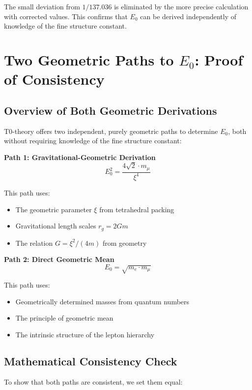 \documentclass[12pt,a4paper]{article}
\begin{document}
	The small deviation from $1/137.036$ is eliminated by the more precise calculation with corrected values. This confirms that $E_0$ can be derived independently of knowledge of the fine structure constant.
	
	\section{Two Geometric Paths to $E_0$: Proof of Consistency}
	
	\subsection{Overview of Both Geometric Derivations}
	
	T0-theory offers two independent, purely geometric paths to determine $E_0$, both without requiring knowledge of the fine structure constant:
	
	\textbf{Path 1: Gravitational-Geometric Derivation}
	\begin{equation}
		E_0^2 = \frac{4\sqrt{2} \cdot m_\mu}{\xi^4}
	\end{equation}
	
	This path uses:
	\begin{itemize}
		\item The geometric parameter $\xi$ from tetrahedral packing
		\item Gravitational length scales $r_g = 2Gm$
		\item The relation $G = \xi^2/(4m)$ from geometry
	\end{itemize}
	
	\textbf{Path 2: Direct Geometric Mean}
	\begin{equation}
		E_0 = \sqrt{m_e \cdot m_\mu}
	\end{equation}
	
	This path uses:
	\begin{itemize}
		\item Geometrically determined masses from quantum numbers
		\item The principle of geometric mean
		\item The intrinsic structure of the lepton hierarchy
	\end{itemize}
	
	\subsection{Mathematical Consistency Check}
	
	To show that both paths are consistent, we set them equal:
	
\end{document}
